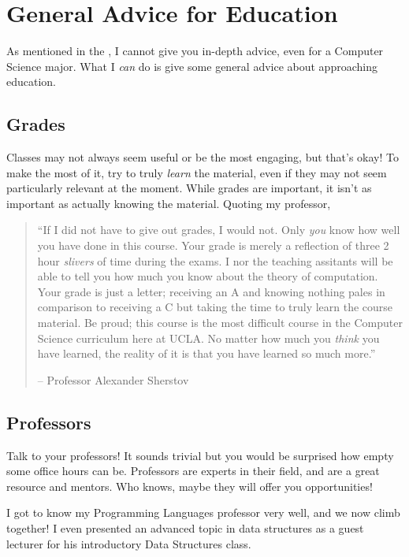 \documentclass[12pt]{article}
\newenvironment{example}{
\begin{tcolorbox}[title=Example, colback=blue!5!white, colframe=black!75!blue]
}{ \end{tcolorbox} }
\renewcommand{\it}[1]{\textit{{#1}}}
\renewcommand{\bf}[1]{\textbf{{#1}}}
\begin{document}
\section{General Advice for Education}
As mentioned in the \bf{}, I cannot give you in-depth
advice, even for a Computer Science major. What I \it{can} do is give some
general advice about approaching education.

\subsection{Grades}
Classes may not always seem useful or be the most engaging, but that's okay! To make
the most of it, try to truly \it{learn} the material, even if they may not seem
particularly relevant at the moment. While grades are important, it isn't as
important as actually knowing the material. Quoting my professor,
\begin{quote}
    ``If I did not have to give out grades, I would not. Only \it{you} know how
    well you have done in this course. Your grade is merely a reflection of
    three 2 hour \it{slivers} of time during the exams. I nor the teaching
    assitants will be able to tell you how much you know about the theory of
    computation. Your grade is just a letter; receiving an A and knowing nothing
    pales in comparison to receiving a C but taking the time to truly learn the
    course material. Be proud; this course is the most difficult course in the
    Computer Science curriculum here at UCLA. No matter how much you \it{think}
    you have learned, the reality of it is that you have learned so much more.''
    \vspace{-1em}
    \begin{flushright}
        -- Professor Alexander Sherstov
    \end{flushright}
\end{quote}

\subsection{Professors}
Talk to your professors! It sounds trivial but you would be surprised how empty
some office hours can be. Professors are experts in their field, and are a great
resource and mentors. Who knows, maybe they will offer you opportunities!
\begin{example}
    I got to know my Programming Languages professor very well, and we now climb
    together! I even presented an advanced topic in data structures as a guest
    lecturer for his introductory Data Structures class.
\end{example}
\end{document}
